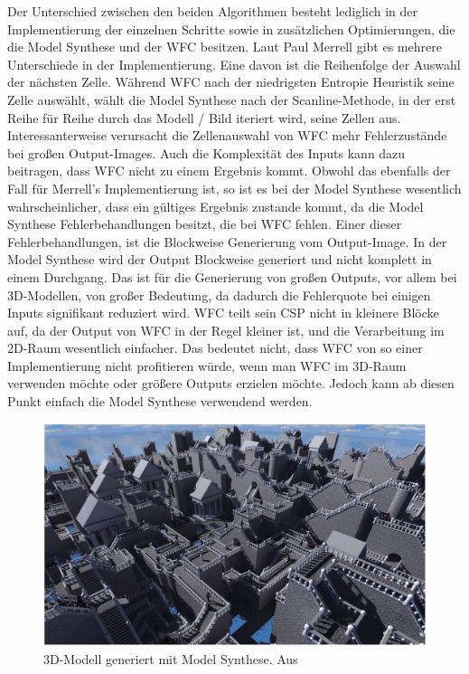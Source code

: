 \documentclass[12pt, a4paper,twoside,openright]{report} %
\begin{document}
Der Unterschied zwischen den beiden Algorithmen besteht lediglich in der Implementierung der einzelnen Schritte sowie in zusätzlichen Optimierungen,
die die Model Synthese und der WFC besitzen.
Laut Paul Merrell gibt es mehrere Unterschiede in der Implementierung.
\newline
Eine davon ist die Reihenfolge der Auswahl der nächsten Zelle.
Während WFC nach der niedrigsten Entropie Heuristik seine Zelle auswählt,
wählt die Model Synthese nach der Scanline-Methode, in der erst Reihe für Reihe durch das Modell / Bild iteriert wird, seine Zellen aus.
Interessanterweise verursacht die Zellenauswahl von WFC mehr Fehlerzustände bei großen Output-Images.
Auch die Komplexität des Inputs kann dazu beitragen, dass WFC nicht zu einem Ergebnis kommt.
Obwohl das ebenfalls der Fall für Merrell's Implementierung ist, so ist es bei der Model Synthese wesentlich wahrscheinlicher, dass ein gültiges Ergebnis zustande kommt,
da die Model Synthese Fehlerbehandlungen besitzt, die bei WFC fehlen.
\newline
Einer dieser Fehlerbehandlungen, ist die Blockweise Generierung vom Output-Image.
In der Model Synthese wird der Output Blockweise generiert und nicht komplett in einem Durchgang.
Das ist für die Generierung von großen Outputs, vor allem bei 3D-Modellen, von großer Bedeutung, da dadurch die Fehlerquote bei einigen Inputs signifikant reduziert wird.
WFC teilt sein CSP nicht in kleinere Blöcke auf, da der Output von WFC in der Regel kleiner ist, und die Verarbeitung im 2D-Raum wesentlich einfacher.
Das bedeutet nicht, dass WFC von so einer Implementierung nicht profitieren würde, wenn man WFC im 3D-Raum verwenden möchte oder größere Outputs erzielen möchte.
Jedoch kann ab diesen Punkt einfach die Model Synthese verwendend werden. \cite{merrell2018compare}

\begin{figure}[H]
    \centering
    \includegraphics[width=1\linewidth]{images/3D-model-synthese.JPG}%
    \caption{3D-Modell generiert mit Model Synthese. Aus \cite{merrell2018compare}}%
\end{figure}
\end{document}
